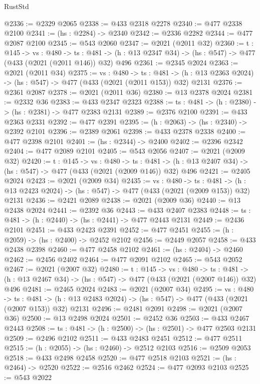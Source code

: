 \begin{lexlean}{RustStd}
\begin{coremodule}
@2336 := @2329 @2065
@2338 := @433 @2318 @2278
@2340 := @477 @2338 @2100
@2341 := (hs : @2284) -> @2340
@2342 := @2336 @2282
@2344 := @477 @2087 @2100
@2345 := @543 @2060
@2347 := @2021 (@2011 @32)
@2360 := {t : @145} ->
  {vs : @480} ->
  {ts : @481} -> (h : @13 @2347 @34) -> (hs : @547) -> @477 (@433 (@2021 (@2011 @146)) @32) @496
@2361 := @2345 @2024
@2363 := @2021 (@2011 @34)
@2375 := {vs : @480} ->
  {ts : @481} -> (h : @13 @2363 @2024) -> (hs : @547) -> @477 (@433 (@2021 (@2011 @153)) @32) @2131
@2376 := @2361 @2087
@2378 := @2021 (@2011 @36)
@2380 := @13 @2378 @2024
@2381 := @2332 @36
@2383 := @433 @2347 @2323
@2388 := {ts : @481} -> (h : @2380) -> (hs : @2381) -> @477 @2383 @2131
@2389 := @2376 @2100
@2391 := @433 @2363 @2331
@2392 := @477 @2391
@2395 := (h : @2063) -> (hs : @2340) -> @2392 @2101
@2396 := @2389 @2061
@2398 := @433 @2378 @2338
@2400 := @477 @2398 @2101
@2401 := (hs : @2344) -> @2400
@2402 := @2396 @2342
@2404 := @477 @2089 @2101
@2405 := @543 @2056
@2407 := @2021 (@2009 @32)
@2420 := {t : @145} ->
  {vs : @480} ->
  {ts : @481} -> (h : @13 @2407 @34) -> (hs : @547) -> @477 (@433 (@2021 (@2009 @146)) @32) @496
@2421 := @2405 @2024
@2423 := @2021 (@2009 @34)
@2435 := {vs : @480} ->
  {ts : @481} -> (h : @13 @2423 @2024) -> (hs : @547) -> @477 (@433 (@2021 (@2009 @153)) @32) @2131
@2436 := @2421 @2089
@2438 := @2021 (@2009 @36)
@2440 := @13 @2438 @2024
@2441 := @2392 @36
@2443 := @433 @2407 @2383
@2448 := {ts : @481} -> (h : @2440) -> (hs : @2441) -> @477 @2443 @2131
@2449 := @2436 @2101
@2451 := @433 @2423 @2391
@2452 := @477 @2451
@2455 := (h : @2059) -> (hs : @2400) -> @2452 @2102
@2456 := @2449 @2057
@2458 := @433 @2438 @2398
@2460 := @477 @2458 @2102
@2461 := (hs : @2404) -> @2460
@2462 := @2456 @2402
@2464 := @477 @2091 @2102
@2465 := @543 @2052
@2467 := @2021 (@2007 @32)
@2480 := {t : @145} ->
  {vs : @480} ->
  {ts : @481} -> (h : @13 @2467 @34) -> (hs : @547) -> @477 (@433 (@2021 (@2007 @146)) @32) @496
@2481 := @2465 @2024
@2483 := @2021 (@2007 @34)
@2495 := {vs : @480} ->
  {ts : @481} -> (h : @13 @2483 @2024) -> (hs : @547) -> @477 (@433 (@2021 (@2007 @153)) @32) @2131
@2496 := @2481 @2091
@2498 := @2021 (@2007 @36)
@2500 := @13 @2498 @2024
@2501 := @2452 @36
@2503 := @433 @2467 @2443
@2508 := {ts : @481} -> (h : @2500) -> (hs : @2501) -> @477 @2503 @2131
@2509 := @2496 @2102
@2511 := @433 @2483 @2451
@2512 := @477 @2511
@2515 := (h : @2055) -> (hs : @2460) -> @2512 @2103
@2516 := @2509 @2053
@2518 := @433 @2498 @2458
@2520 := @477 @2518 @2103
@2521 := (hs : @2464) -> @2520
@2522 := @2516 @2462
@2524 := @477 @2093 @2103
@2525 := @543 @2022

\end{coremodule}
\end{lexlean}
